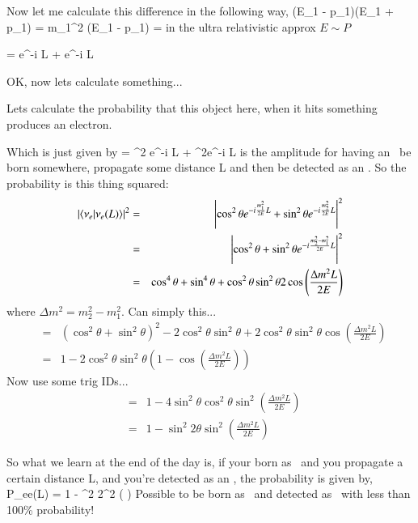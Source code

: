 {Now let me calculate this difference in the following way,
\be
(E_1 - p_1)(E_1 + p_1) = m_1^2  \Rightarrow  (E_1 - p_1) =  
\ee
in the ultra relativistic approx $E \sim P$


\be
{} = \cos\theta e^{-i  L} \ket{\nuone} + \sin\theta e^{-i  L} \ket{\nutwo}
\ee

OK, now lets calculate something...


Lets calculate the probability that this object here, when it hits something produces an electron. 

Which is just given by 
\be
{} = \cos^2 \theta e^{-i  L} + \sin^2\theta e^{-i  L} 
\ee
is the amplitude for having an \nue\ be born somewhere, propagate some distance L and then be detected as an \nue.
So the probability is this thing squared:
\begin{eqnarray*}
\left|\braket{\nu_e | \nu_e(L) }\right|^2 &=& \left|\cos^2 \theta e^{-i \frac{m_1^2}{2E} L} + \sin^2\theta e^{-i \frac{m_2^2}{2E} L} \right|^2\\
       &=& \left|\cos^2 \theta+ \sin^2\theta e^{-i \frac{m_2^2 - m_1^2}{2E} L} \right|^2\\
       &=& \cos^4 \theta+ \sin^4\theta  + \cos^2\theta \sin^2 \theta 2 \cos \left( \frac{\Delta m^2 L}{2E} \right)
\end{eqnarray*}
where $\Delta m^2 = m_2^2 - m_1^2$.
Can simply this...
\begin{eqnarray*}
 &=& \left( \cos^2 \theta + \sin^2 \theta \right)^2  - 2 \cos^2 \theta \sin^2 \theta  + 2 \cos^2 \theta \sin^2 \theta \cos \left( \frac{\Delta m^2 L}{2E} \right) \\
 &=& 1 - 2 \cos^2 \theta \sin^2 \theta \left( 1  - \cos \left( \frac{\Delta m^2 L}{2E} \right) \right)
\end{eqnarray*}
Now use some  trig IDs...
\begin{eqnarray*}
 &=& 1 - 4 \sin^2 \theta \cos^2 \theta \sin^2 \left( \frac{\Delta m^2 L}{2E} \right)\\
 &=& 1 -  \sin^2 2\theta \sin^2 \left( \frac{\Delta m^2 L}{2E} \right)
\end{eqnarray*}

So what we learn at the end of the day is, if your born as \nue\ and you propagate a certain distance L, and you're detected as an \nue, the probability is given by,
\be 
P_{ee}(L) = 1 - \sin^2 2\theta \sin^2 \left(  \right)
\ee 
Possible to be born as \nue\ and detected as \nue\ with less than 100\% probability!

}
